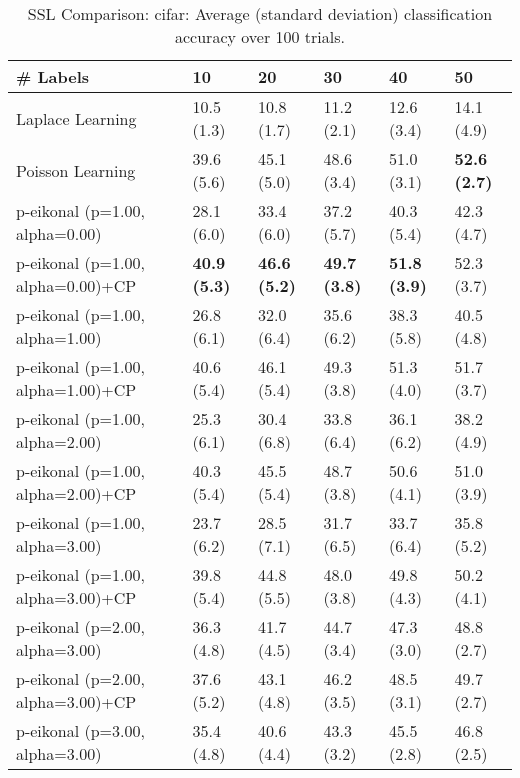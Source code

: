\documentclass{article}
\begin{document}
\begin{table*}[t!]
\vspace{-3mm}
\caption{SSL Comparison: cifar: Average (standard deviation) classification accuracy over 100 trials.}
\vspace{-3mm}
\label{tab:SSL Comparison: cifar}
\vskip 0.15in
\begin{center}
\begin{small}
\begin{sc}
\begin{tabular}{llllll}
\toprule
\# Labels&\textbf{10}&\textbf{20}&\textbf{30}&\textbf{40}&\textbf{50}\\
\midrule
Laplace Learning&10.5 (1.3)      &10.8 (1.7)      &11.2 (2.1)      &12.6 (3.4)      &14.1 (4.9)      \\
Poisson Learning&39.6 (5.6)      &45.1 (5.0)      &48.6 (3.4)      &51.0 (3.1)      &{\bf 52.6 (2.7)}\\
p-eikonal (p=1.00, alpha=0.00)&28.1 (6.0)      &33.4 (6.0)      &37.2 (5.7)      &40.3 (5.4)      &42.3 (4.7)      \\
p-eikonal (p=1.00, alpha=0.00)+CP&{\bf 40.9 (5.3)}&{\bf 46.6 (5.2)}&{\bf 49.7 (3.8)}&{\bf 51.8 (3.9)}&52.3 (3.7)      \\
p-eikonal (p=1.00, alpha=1.00)&26.8 (6.1)      &32.0 (6.4)      &35.6 (6.2)      &38.3 (5.8)      &40.5 (4.8)      \\
p-eikonal (p=1.00, alpha=1.00)+CP&40.6 (5.4)      &46.1 (5.4)      &49.3 (3.8)      &51.3 (4.0)      &51.7 (3.7)      \\
p-eikonal (p=1.00, alpha=2.00)&25.3 (6.1)      &30.4 (6.8)      &33.8 (6.4)      &36.1 (6.2)      &38.2 (4.9)      \\
p-eikonal (p=1.00, alpha=2.00)+CP&40.3 (5.4)      &45.5 (5.4)      &48.7 (3.8)      &50.6 (4.1)      &51.0 (3.9)      \\
p-eikonal (p=1.00, alpha=3.00)&23.7 (6.2)      &28.5 (7.1)      &31.7 (6.5)      &33.7 (6.4)      &35.8 (5.2)      \\
p-eikonal (p=1.00, alpha=3.00)+CP&39.8 (5.4)      &44.8 (5.5)      &48.0 (3.8)      &49.8 (4.3)      &50.2 (4.1)      \\
p-eikonal (p=2.00, alpha=3.00)&36.3 (4.8)      &41.7 (4.5)      &44.7 (3.4)      &47.3 (3.0)      &48.8 (2.7)      \\
p-eikonal (p=2.00, alpha=3.00)+CP&37.6 (5.2)      &43.1 (4.8)      &46.2 (3.5)      &48.5 (3.1)      &49.7 (2.7)      \\
p-eikonal (p=3.00, alpha=3.00)&35.4 (4.8)      &40.6 (4.4)      &43.3 (3.2)      &45.5 (2.8)      &46.8 (2.5)      \\

\end{tabular}
\end{sc}
\end{small}
\end{center}
\end{table*}
\end{document}
